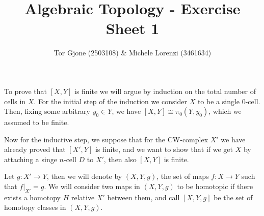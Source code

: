 \documentclass[a4paper,11pt,english]{article}
\title{\textbf{Algebraic Topology} - Exercise Sheet 1}
\author{Tor Gjone (2503108) \& Michele Lorenzi (3461634)}
\begin{document}
\mmaketitle

\begin{exercise}[1]

To prove that $[X,Y]$ is finite we will argue by induction on the total number of cells in $X$. For the initial step of the induction we consider $X$ to be a single $0$-cell. Then, fixing some arbitrary $y_0 \in Y$, we  have $[X,Y] \cong \pi_0(Y,y_0)$, which we 
assumed to be finite.

Now for the inductive step, we suppose that for the CW-complex $X'$ we have already proved that $[X',Y]$ is finite, and we want to show that if we get $X$ by attaching a singe $n$-cell $D$ to $X'$, then also $[X,Y]$ is finite.

Let $g : X' \to Y$, then we will denote by $(X,Y,g)$, the set of maps $f: X \to Y$ such that $f|_{X'} = g$. 
We will consider two maps in $(X,Y,g)$ to be homotopic if there exists a homotopy $H$ relative $X'$ between them, and call $[X,Y,g]$ be the set of homotopy classes in $(X,Y,g)$.


\end{exercise}
\end{document}
